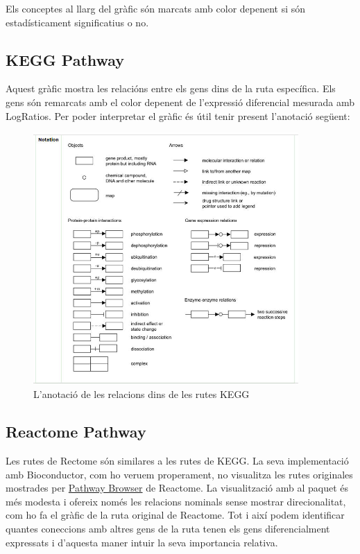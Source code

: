 Els conceptes al llarg del gràfic són marcats amb color depenent si són estadísticament significatius o no.

\subsection{KEGG Pathway}
Aquest gràfic mostra les relacións entre els gens dins de la ruta específica. Els gens són remarcats amb el color depenent de l'expressió diferencial mesurada amb LogRatios. Per poder interpretar el gràfic és útil tenir present l'anotació següent:

\begin{figure}[H]
\centering
\includegraphics[width=0.9\textwidth]{figures/Annotation_KEGG.jpg} 
\caption{L'anotació de les relacions dins de les rutes KEGG}
\end{figure}

\subsection{Reactome Pathway}

Les rutes de Rectome són similares a les rutes de KEGG. La seva implementació amb Bioconductor, com ho veruem properament, no visualitza les rutes originales mostrades per \href{https://reactome.org/PathwayBrowser/}{Pathway Browser} de Reactome. La visualització amb al paquet  és més modesta i ofereix només les relacions nominals sense mostrar direcionalitat, com ho fa el gràfic de la ruta original de Reactome. Tot i així podem identificar quantes coneccions amb altres gens de la ruta tenen els gens diferencialment expressats i d'aquesta maner intuir la seva importancia relativa.  

